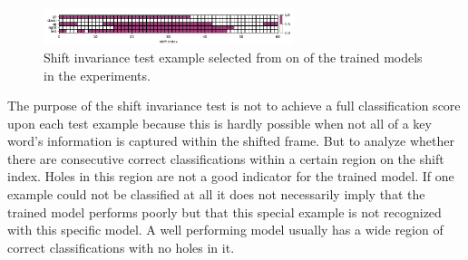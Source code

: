 \begin{figure}[!ht]
  \centering
    \includegraphics[width=0.65\textwidth]{./5_exp/figs/exp_fs_cepstral_tb_shift_conv-jim_mfcc12_norm0.png}
  \caption{Shift invariance test example selected from on of the trained models in the experiments.}
  \label{fig:exp_details_tb_shift}
\end{figure}
\FloatBarrier
\noindent
The purpose of the shift invariance test is not to achieve a full classification score upon each test example because this is hardly possible when not all of a key word's information is captured within the shifted frame.
But to analyze whether there are consecutive correct classifications within a certain region on the shift index.
Holes in this region are not a good indicator for the trained model.
If one example could not be classified at all it does not necessarily imply that the trained model performs poorly but that this special example is not recognized with this specific model.
A well performing model usually has a wide region of correct classifications with no holes in it.



